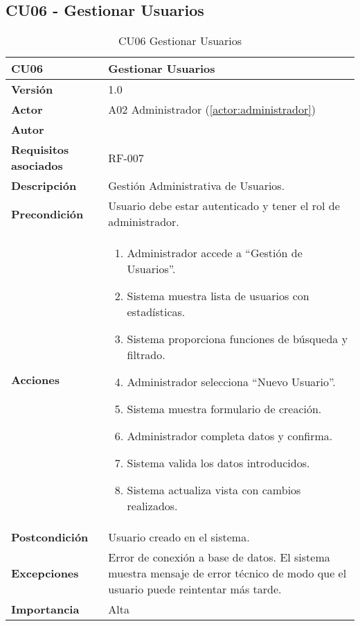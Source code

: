 \subsection{CU06 - Gestionar Usuarios}

\begin{table}[H]
	\centering
	\begin{tabularx}{\linewidth}{ p{} p{} }
		\toprule
		\textbf{CU06}    & \textbf{Gestionar Usuarios} \\
		\toprule
		\textbf{Versión}              & 1.0    \\
		\textbf{Actor}                & A02 Administrador (\ref{actor:administrador}) \\
		\textbf{Autor}                & \nombre \\
		\textbf{Requisitos asociados} & RF-007 \\
		\textbf{Descripción}          & Gestión Administrativa de Usuarios. \\
		\textbf{Precondición}         & Usuario debe estar autenticado y tener el rol de administrador. \\
		\textbf{Acciones}             &
		\begin{enumerate}
			\def\labelenumi{\arabic{enumi}.}
			\tightlist
			\item Administrador accede a ``Gestión de Usuarios''.
            \item Sistema muestra lista de usuarios con estadísticas.
            \item Sistema proporciona funciones de búsqueda y filtrado.
            \item Administrador selecciona ``Nuevo Usuario''.
 	    \item Sistema muestra formulario de creación.
            \item Administrador completa datos y confirma.
            \item Sistema valida los datos introducidos.
            \item Sistema actualiza vista con cambios realizados.
		\end{enumerate}\\
		\textbf{Postcondición}        & Usuario creado en el sistema.\\
		\textbf{Excepciones}          & Error de conexión a base de datos. El sistema muestra mensaje de error técnico de modo que el usuario puede reintentar más tarde.\\
		\textbf{Importancia}          & Alta \\
		\bottomrule
	\end{tabularx}
	\caption{CU06 Gestionar Usuarios}
	\label{cu:gestionar-usuarios}
\end{table}

